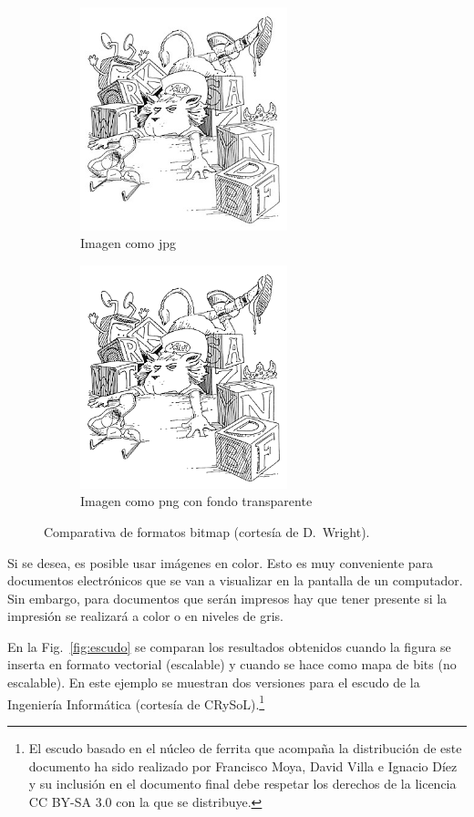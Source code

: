 \documentclass[11pt,a4paper]{article}
\begin{document}
\begin{figure}[hbt]
	\centering
  	\begin{subfigure}[b]{0.4\textwidth}
  		\centering
		\includegraphics[width=6cm]{lionL.jpg}
		\caption{Imagen como jpg}\label{fig:lionLjpg}
  	\end{subfigure}
  	\begin{subfigure}[b]{0.4\textwidth}
  		\centering
		\includegraphics[width=6cm]{lionL.png}
		\caption{Imagen como png con fondo transparente}\label{fig:lionpng}
  	\end{subfigure}
  	\caption[Comparación jpg y png con transparencia]{Comparativa de formatos bitmap (cortesía de D.~Wright).}
	\label{fig:lion}
\end{figure}

Si se desea, es posible usar imágenes en color. Esto es muy conveniente para documentos electrónicos que se van a visualizar en la pantalla de un computador. Sin embargo, para documentos que serán impresos hay que tener presente si la impresión se realizará a color o en niveles de gris. 

En la Fig.~\ref{fig:escudo} se comparan los resultados obtenidos cuando la figura se inserta en formato vectorial (escalable) y cuando se hace como mapa de bits (no escalable). En este ejemplo se muestran dos versiones para el escudo de la Ingeniería Informática (cortesía de CRySoL).\footnote{El escudo basado en el núcleo de ferrita que acompaña la distribución de este documento ha sido realizado por Francisco Moya, David Villa e Ignacio Díez y su inclusión en el documento final debe respetar los derechos de la licencia CC BY-SA 3.0 con la que se distribuye.}
\end{document}
